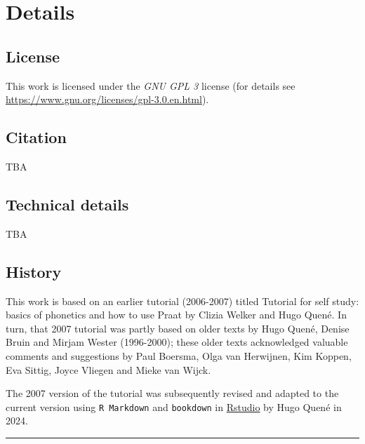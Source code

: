 \documentclass[
]{book}
\begin{document}
\section*{Details}\label{details}

\subsection*{License}\label{license}

This work is licensed under the \emph{GNU GPL 3} license (for details see
\url{https://www.gnu.org/licenses/gpl-3.0.en.html}).

\subsection*{Citation}\label{citation}

TBA

\subsection*{Technical details}\label{technical-details}

TBA

\subsection*{History}\label{history}

This work is based on an earlier tutorial (2006-2007) titled Tutorial for self study: basics of phonetics and how to use Praat by Clizia Welker and Hugo Quené. In turn, that 2007 tutorial was partly based on older texts by Hugo Quené, Denise Bruin and Mirjam Wester (1996-2000); these older texts acknowledged valuable comments and suggestions by Paul Boersma, Olga van Herwijnen, Kim Koppen, Eva Sittig, Joyce Vliegen and Mieke van Wijck.

The 2007 version of the tutorial was subsequently revised and adapted to the current version using \texttt{R\ Markdown} \citep{rmarkdown2018} and \texttt{bookdown} \citep{R-bookdown} in \href{https://www.rstudio.com}{Rstudio} by Hugo Quené in 2024.

\begin{center}\rule{0.5\linewidth}{0.5pt}\end{center}
\end{document}
